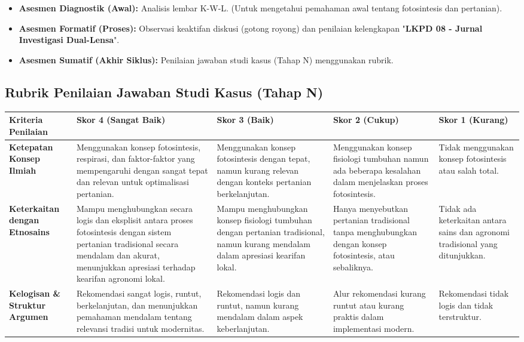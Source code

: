 \documentclass[a4paper,12pt]{article}
\begin{document}
\begin{itemize}
\item \textbf{Asesmen Diagnostik (Awal):} Analisis lembar K-W-L. (Untuk mengetahui pemahaman awal tentang fotosintesis dan pertanian).
\item \textbf{Asesmen Formatif (Proses):} Observasi keaktifan diskusi (gotong royong) dan penilaian kelengkapan "\textbf{LKPD 08 - Jurnal Investigasi Dual-Lensa}".
\item \textbf{Asesmen Sumatif (Akhir Siklus):} Penilaian jawaban studi kasus (Tahap N) menggunakan rubrik.
\end{itemize}

\subsection{Rubrik Penilaian Jawaban Studi Kasus (Tahap N)}

\begin{longtable}{|p{3cm}|p{3cm}|p{3cm}|p{3cm}|p{3cm}|}
\hline
\textbf{Kriteria Penilaian} & \textbf{Skor 4 (Sangat Baik)} & \textbf{Skor 3 (Baik)} & \textbf{Skor 2 (Cukup)} & \textbf{Skor 1 (Kurang)} \\
\hline
\textbf{Ketepatan Konsep Ilmiah} & Menggunakan konsep fotosintesis, respirasi, dan faktor-faktor yang mempengaruhi dengan sangat tepat dan relevan untuk optimalisasi pertanian. & Menggunakan konsep fotosintesis dengan tepat, namun kurang relevan dengan konteks pertanian berkelanjutan. & Menggunakan konsep fisiologi tumbuhan namun ada beberapa kesalahan dalam menjelaskan proses fotosintesis. & Tidak menggunakan konsep fotosintesis atau salah total. \\
\hline
\textbf{Keterkaitan dengan Etnosains} & Mampu menghubungkan secara logis dan eksplisit antara proses fotosintesis dengan sistem pertanian tradisional secara mendalam dan akurat, menunjukkan apresiasi terhadap kearifan agronomi lokal. & Mampu menghubungkan konsep fisiologi tumbuhan dengan pertanian tradisional, namun kurang mendalam dalam apresiasi kearifan lokal. & Hanya menyebutkan pertanian tradisional tanpa menghubungkan dengan konsep fotosintesis, atau sebaliknya. & Tidak ada keterkaitan antara sains dan agronomi tradisional yang ditunjukkan. \\
\hline
\textbf{Kelogisan \& Struktur Argumen} & Rekomendasi sangat logis, runtut, berkelanjutan, dan menunjukkan pemahaman mendalam tentang relevansi tradisi untuk modernitas. & Rekomendasi logis dan runtut, namun kurang mendalam dalam aspek keberlanjutan. & Alur rekomendasi kurang runtut atau kurang praktis dalam implementasi modern. & Rekomendasi tidak logis dan tidak terstruktur. \\
\hline
\end{longtable}
\end{document}
